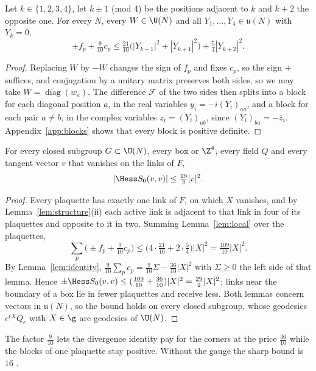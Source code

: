 \begin{lemma}\label{lem:local}
Let $k\in\{1,2,3,4\}$, let $k\pm1$ \textup{(}mod $4$\textup{)} be the
positions adjacent to $k$ and $k+2$ the opposite one. For every $N$, every
$W\in\U(N)$ and all $Y_1,\dots,Y_4\in\mathfrak u(N)$ with $Y_k=0$,
\[
\pm f_p+\tfrac9{10}c_p\le\tfrac{21}{10}\bigl(|Y_{k-1}|^2+|Y_{k+1}|^2\bigr)
+\tfrac54|Y_{k+2}|^2 .
\]
\end{lemma}

\begin{proof}
Replacing $W$ by $-W$ changes the sign of $f_p$ and fixes $c_p$, so the sign
$+$ suffices, and conjugation by a unitary matrix preserves both sides, so we
may take $W=\operatorname{diag}(w_a)$. The difference $\mathcal F$ of the two
sides then splits into a block for each diagonal position $a$, in the real
variables $y_i=-i(Y_i)_{aa}$, and a block for each pair $a\ne b$, in the
complex variables $z_i=(Y_i)_{ab}$, since $(Y_i)_{ba}=-\bar z_i$.
Appendix~\ref{app:blocks} shows that every block is positive definite.
\end{proof}

\begin{theorem}\label{thm:hess}
For every closed subgroup $G\subset\U(N)$, every box or $\Z^4$, every field
$Q$ and every tangent vector $v$ that vanishes on the links of $F$,
\[
|\Hess S_0(v,v)|\le\tfrac{29}2|v|^2 .
\]
\end{theorem}

\begin{proof}
Every plaquette has exactly one link of $F$, on which $X$ vanishes, and by
Lemma~\ref{lem:structure}(ii) each active link is adjacent to that link in
four of its plaquettes and opposite to it in two. Summing
Lemma~\ref{lem:local} over the plaquettes,
\[
\sum_p\bigl(\pm f_p+\tfrac9{10}c_p\bigr)\le\bigl(4\cdot\tfrac{21}{10}+2\cdot
\tfrac54\bigr)|X|^2=\tfrac{109}{10}|X|^2 .
\]
By Lemma~\ref{lem:identity}, $\frac9{10}\sum_pc_p=\frac9{10}\Sigma-\frac{36}{10}
|X|^2$ with $\Sigma\ge0$ the left side of that lemma. Hence $\pm\Hess S_0(v,v)
\le(\frac{109}{10}+\frac{36}{10})|X|^2=\frac{29}2|X|^2$; links near the boundary
of a box lie in fewer plaquettes and receive less. Both lemmas concern
vectors in $\mathfrak u(N)$, so the bound holds on every closed subgroup, whose
geodesics $e^{tX}Q_e$ with $X\in\g$ are geodesics of $\U(N)$.
\end{proof}

The factor $\frac9{10}$ lets the divergence identity pay for the corners at
the price $\frac{36}{10}$ while the blocks of one plaquette stay positive.
Without the gauge the sharp bound is $16$ \cite{BB26a}.

